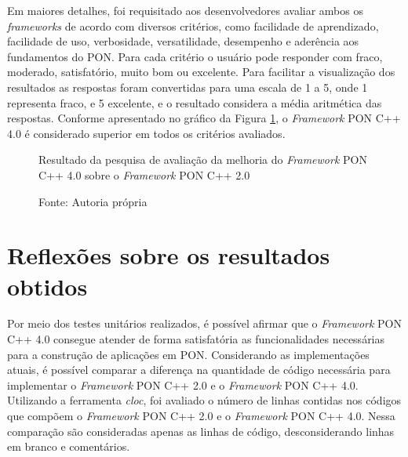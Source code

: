 Em maiores detalhes, foi requisitado aos desenvolvedores avaliar ambos os
\textit{frameworks} de acordo com diversos critérios, como facilidade de
aprendizado, facilidade de uso, verbosidade, versatilidade, desempenho e
aderência aos fundamentos do PON. Para cada critério o usuário pode responder
com fraco, moderado, satisfatório, muito bom ou excelente. Para facilitar a
visualização dos resultados as respostas foram convertidas para uma escala de 1
a 5, onde 1 representa fraco, e 5 excelente, e o resultado considera a média
aritmética das respostas. Conforme apresentado no gráfico da Figura
\ref{fig:fw_compare2}, o \textit{Framework} PON C++ 4.0 é considerado  superior
em todos os critérios avaliados.

\begin{figure}[!htb]
\centering
{}
\caption{Resultado da pesquisa de avaliação da melhoria do \textit{Framework}
PON C++ 4.0 sobre o \textit{Framework} PON C++ 2.0}
\caption*{Fonte: Autoria própria}
\label{fig:fw_compare2}
\end{figure}

\section{Reflexões sobre os resultados obtidos}\label{sec:fw4_reflex}

Por meio dos testes unitários realizados, é possível afirmar que o
\textit{Framework} PON C++ 4.0 consegue atender de forma satisfatória as
funcionalidades necessárias para a construção de aplicações em PON. Considerando
as implementações atuais, é possível comparar a diferença na quantidade de
código necessária para implementar o \textit{Framework} PON C++ 2.0 e o
\textit{Framework} PON C++ 4.0. Utilizando a ferramenta \textit{cloc}, foi
avaliado o número de linhas contidas nos códigos que compõem o
\textit{Framework} PON C++ 2.0 e o \textit{Framework} PON C++ 4.0. Nessa
comparação são consideradas apenas as linhas de código, desconsiderando linhas
em branco e comentários.

